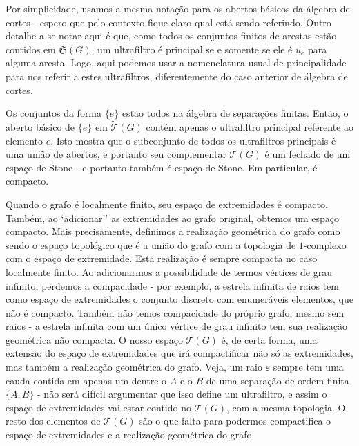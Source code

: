 \documentclass[11pt]{article}
\newcommand{\pulinho}{\vspace{.5cm}}
\theoremstyle{definition}
\theoremstyle{definition}
\theoremstyle{definition}
\theoremstyle{definition}
\theoremstyle{definition}
\theoremstyle{definition}
\theoremstyle{definition}
\theoremstyle{definition}
\theoremstyle{definition}
\theoremstyle{definition}
\theoremstyle{definition}
\theoremstyle{definition}
\begin{document}
Por simplicidade, usamos a mesma notação para os abertos básicos da álgebra de cortes - espero que pelo contexto fique claro qual está sendo referindo. Outro detalhe a se notar aqui é que, como todos os conjuntos finitos de arestas estão contidos em $\mathfrak{S}(G)$, um ultrafiltro é principal se e somente se ele é $u_e$ para alguma aresta. Logo, aqui podemos usar a nomenclatura usual de principalidade para nos referir a estes ultrafiltros, diferentemente do caso anterior de álgebra de cortes.

\pulinho

Os conjuntos da forma $\{e\}$ estão todos na álgebra de separações finitas. Então, o aberto básico de $\{e\}$ em $\widetilde{\mathcal{T}}(G)$ contém apenas o ultrafiltro principal referente ao elemento $e$. Isto mostra que o subconjunto de todos os ultrafiltros principais é uma união de abertos, e portanto seu complementar $\mathcal{T}(G)$ é um fechado de um espaço de Stone - e portanto também é espaço de Stone. Em particular, é compacto.

Quando o grafo é localmente finito, seu espaço de extremidades é compacto. Também, ao `adicionar'' as extremidades ao grafo original, obtemos um espaço compacto. Mais precisamente, definimos a realização geométrica do grafo como sendo o espaço topológico que é a união do grafo com a topologia de $1$-complexo com o espaço de extremidade. Esta realização é sempre compacta no caso localmente finito. Ao adicionarmos a possibilidade de termos vértices de grau infinito, perdemos a compacidade - por exemplo, a estrela infinita de raios tem como espaço de extremidades o conjunto discreto com enumeráveis elementos, que não é compacto. Também não temos compacidade do próprio grafo, mesmo sem raios - a estrela infinita com um único vértice de grau infinito tem sua realização geométrica não compacta. O nosso espaço $\mathcal{T}(G)$ é, de certa forma, uma extensão do espaço de extremidades que irá compactificar não só as extremidades, mas também a realização geométrica do grafo. Veja, um raio $\varepsilon$ sempre tem uma cauda contida em apenas um dentre o $A$ e o $B$ de uma separação de ordem finita $\{A,B\}$ - não será difícil argumentar que isso define um ultrafiltro, e assim o espaço de extremidades vai estar contido no $\mathcal{T}(G)$, com a mesma topologia. O resto dos elementos de $\mathcal{T}(G)$ são o que falta para podermos compactifica o espaço de extremidades e a realização geométrica do grafo.
\end{document}
